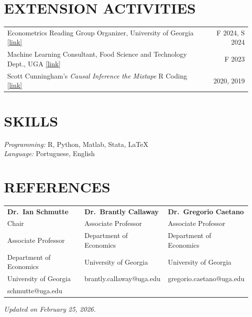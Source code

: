 \documentclass[11pt,letterpaper]{article}
\begin{document}
\section*{EXTENSION ACTIVITIES}
\begin{tabularx}{\textwidth}{Xr}
    Econometrics Reading Group Organizer, University of Georgia \href{https://uga-metrics.github.io/}{[link]} & F 2024, S 2024 \\
    Machine Learning Consultant, Food Science and Technology Dept., UGA \href{https://github.com/hugosantanna}{[link]} & F 2023 \\
    Scott Cunningham's \textit{Causal Inference the Mixtape} R Coding \href{https://github.com/hugosantanna}{[link]} & 2020, 2019 \\
\end{tabularx}

\section*{SKILLS}
\hspace{2em} \textit{Programming:} R, Python, Matlab, Stata, \LaTeX \\
\hspace{2em} \textit{Language:} Portuguese, English

\section*{REFERENCES}

\begin{tabularx}{\textwidth}{XXX}
    \textbf{Dr.\ Ian Schmutte} & \textbf{Dr.\ Brantly Callaway} & \textbf{Dr.\ Gregorio Caetano} \\
    Chair & Associate Professor & Associate Professor \\
    Associate Professor & Department of Economics & Department of Economics \\
    Department of Economics & University of Georgia & University of Georgia \\
    University of Georgia & brantly.callaway@uga.edu & gregorio.caetano@uga.edu \\
    schmutte@uga.edu & & \\
\end{tabularx}

\vfill
\hfill \textit{Updated on February 25, 2026.}
\end{document}
